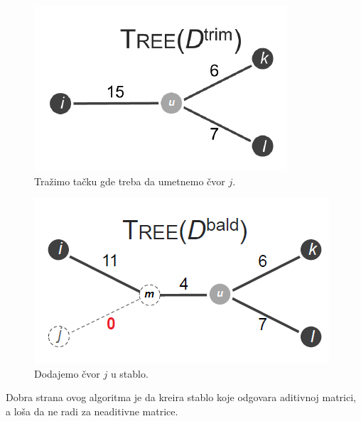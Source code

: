 \begin{minipage}{\textwidth}
	\centering
	\begin{minipage}{0.45\textwidth}
		\begin{figure}[H]
			\centering
			\includegraphics[width=\textwidth]{poglavlja/7/slike/Dtrim.png}
			\caption{Tražimo tačku gde treba da umetnemo čvor $j$.}
			\label{slika:dtrim}
		\end{figure} 
	\end{minipage}
	\hfill 
	\begin{minipage}{0.45\textwidth}
		\begin{figure}[H]
			\centering
			\includegraphics[width=\textwidth]{poglavlja/7/slike/Dbald.png}
			\caption{Dodajemo čvor $j$ u stablo.}
			\label{fig:dbald}
		\end{figure}  
	\end{minipage}
	\vspace*{1em}
\end{minipage}


Dobra strana ovog algoritma je da kreira stablo koje odgovara aditivnoj matrici, a lo\v{s}a da ne radi za neaditivne matrice.
 
